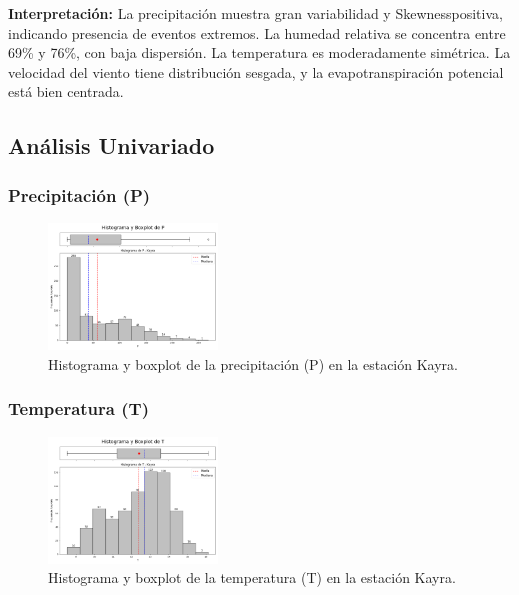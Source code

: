 \textbf{Interpretación:} La precipitación muestra gran variabilidad y Skewnesspositiva, indicando presencia de eventos extremos. La humedad relativa se concentra entre 69\% y 76\%, con baja dispersión. La temperatura es moderadamente simétrica. La velocidad del viento tiene distribución sesgada, y la evapotranspiración potencial está bien centrada.

\subsection{Análisis Univariado}

\subsubsection*{Precipitación (P)}
\begin{figure}[H]
\centering
\includegraphics[width=0.4\textwidth]{resultados/por_estacion_meteorologica/Kayra/P_histograma.png}
\caption{Histograma y boxplot de la precipitación (P) en la estación Kayra.}
\label{fig:kayra_P}
\end{figure}

\subsubsection*{Temperatura (T)}
\begin{figure}[H]
\centering
\includegraphics[width=0.4\textwidth]{resultados/por_estacion_meteorologica/Kayra/T_histograma.png}
\caption{Histograma y boxplot de la temperatura (T) en la estación Kayra.}
\label{fig:kayra_T}
\end{figure}

